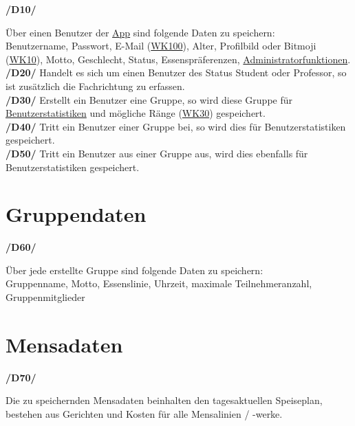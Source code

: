\documentclass[a4paper]{scrreprt}
\begin{document}
\begin{addmargin}[25pt]{0pt}
\hypertarget{d10}{\textbf{/D10/}} Über einen Benutzer der \hyperlink{label6}{App} sind folgende Daten zu speichern:\\
Benutzername, Passwort, E-Mail (\hyperlink{wk100}{WK100}), Alter, Profilbild oder Bitmoji (\hyperlink{wk10}{WK10}), Motto, Geschlecht, Status, Essenspräferenzen, \hyperlink{label8}{Administratorfunktionen}.\\
\hypertarget{d20}{\textbf{/D20/}} Handelt es sich um einen Benutzer des Status Student oder Professor, so ist zusätzlich die Fachrichtung zu erfassen.\\
\hypertarget{d30}{\textbf{/D30/}} Erstellt ein Benutzer eine Gruppe, so wird diese Gruppe für \hyperlink{label9}{Benutzerstatistiken} und mögliche Ränge (\hyperlink{wk30}{WK30}) gespeichert.\\
\hypertarget{d40}{\textbf{/D40/}} Tritt ein Benutzer einer Gruppe bei, so wird dies für Benutzerstatistiken gespeichert.\\
\hypertarget{d50}{\textbf{/D50/}} Tritt ein Benutzer aus einer Gruppe aus, wird dies ebenfalls für Benutzerstatistiken gespeichert.\\


\end{addmargin}

\section{Gruppendaten}

\begin{addmargin}[25pt]{0pt}
\hypertarget{d60}{\textbf{/D60/}} Über jede erstellte Gruppe sind folgende Daten zu speichern:\\
Gruppenname, Motto, Essenslinie, Uhrzeit, maximale Teilnehmeranzahl, Gruppenmitglieder\\
\end{addmargin}

\section{Mensadaten}

\begin{addmargin}[25pt]{0pt}
\hypertarget{d70}{\textbf{/D70/}} Die zu speichernden Mensadaten beinhalten den tagesaktuellen Speiseplan, bestehen aus Gerichten und Kosten für alle Mensalinien / -werke.\\
\end{addmargin}
\end{document}
